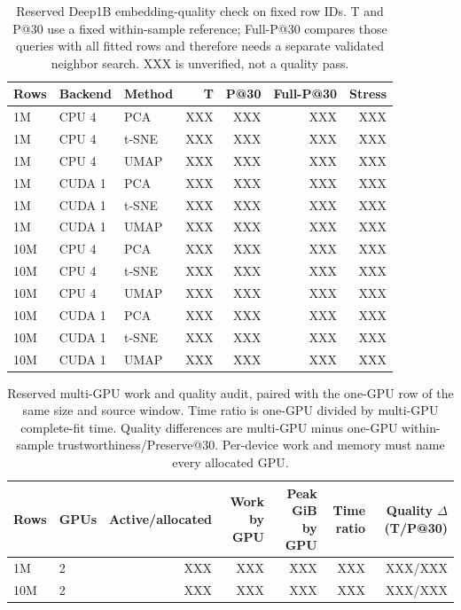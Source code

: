 \documentclass[article]{jss}
\begin{document}
\begin{table}[htbp]
\centering
\scriptsize
\caption{Reserved Deep1B embedding-quality check on fixed row IDs.
  T and P@30 use a fixed within-sample reference; Full-P@30 compares
  those queries with all fitted rows and therefore needs a separate
  validated neighbor search. XXX is unverified, not a quality pass.}
\label{tab:pending-deep-quality}
\begin{tabular}{lllrrrr}
\toprule
Rows & Backend & Method & T & P@30 & Full-P@30 & Stress \\
\midrule
1M & CPU 4 & PCA & XXX & XXX & XXX & XXX \\
1M & CPU 4 & t-SNE & XXX & XXX & XXX & XXX \\
1M & CPU 4 & UMAP & XXX & XXX & XXX & XXX \\
1M & CUDA 1 & PCA & XXX & XXX & XXX & XXX \\
1M & CUDA 1 & t-SNE & XXX & XXX & XXX & XXX \\
1M & CUDA 1 & UMAP & XXX & XXX & XXX & XXX \\
10M & CPU 4 & PCA & XXX & XXX & XXX & XXX \\
10M & CPU 4 & t-SNE & XXX & XXX & XXX & XXX \\
10M & CPU 4 & UMAP & XXX & XXX & XXX & XXX \\
10M & CUDA 1 & PCA & XXX & XXX & XXX & XXX \\
10M & CUDA 1 & t-SNE & XXX & XXX & XXX & XXX \\
10M & CUDA 1 & UMAP & XXX & XXX & XXX & XXX \\
\bottomrule
\end{tabular}
\end{table}

\begin{table}[htbp]
\centering
\scriptsize
\caption{Reserved multi-GPU work and quality audit, paired with the
  one-GPU row of the same size and source window. Time ratio is one-GPU
  divided by multi-GPU complete-fit time. Quality differences are
  multi-GPU minus one-GPU within-sample trustworthiness/Preserve@30.
  Per-device work and memory must name every allocated GPU.}
\label{tab:pending-multigpu}
\begin{tabular}{llrrrrr}
\toprule
Rows & GPUs & Active/allocated & Work by GPU & Peak GiB by GPU &
  Time ratio & Quality $\Delta$ (T/P@30) \\
\midrule
1M & 2 & XXX & XXX & XXX & XXX & XXX/XXX \\
10M & 2 & XXX & XXX & XXX & XXX & XXX/XXX \\
\bottomrule
\end{tabular}
\end{table}
\end{document}
